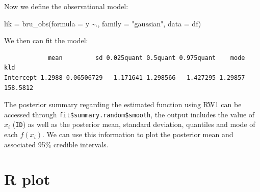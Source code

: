 \documentclass[
  letterpaper,
  DIV=11,
  numbers=noendperiod]{scrartcl}
\newenvironment{Shaded}{\begin{snugshade}}{\end{snugshade}}
\newcommand{\AttributeTok}[1]{\textcolor[rgb]{0.40,0.45,0.13}{#1}}
\newcommand{\FunctionTok}[1]{\textcolor[rgb]{0.28,0.35,0.67}{#1}}
\newcommand{\NormalTok}[1]{\textcolor[rgb]{0.00,0.23,0.31}{#1}}
\newcommand{\OtherTok}[1]{\textcolor[rgb]{0.00,0.23,0.31}{#1}}
\newcommand{\SpecialCharTok}[1]{\textcolor[rgb]{0.37,0.37,0.37}{#1}}
\newcommand{\StringTok}[1]{\textcolor[rgb]{0.13,0.47,0.30}{#1}}
\begin{document}
Now we define the observational model:

\begin{Shaded}
\begin{Highlighting}[]
\NormalTok{lik }\OtherTok{=}  \FunctionTok{bru\_obs}\NormalTok{(}\AttributeTok{formula =}\NormalTok{ y }\SpecialCharTok{\textasciitilde{}}\NormalTok{.,}
            \AttributeTok{family =} \StringTok{"gaussian"}\NormalTok{,}
            \AttributeTok{data =}\NormalTok{ df)}
\end{Highlighting}
\end{Shaded}

We then can fit the model:

\begin{Shaded}
\end{Shaded}

\begin{verbatim}
            mean         sd 0.025quant 0.5quant 0.975quant    mode      kld
Intercept 1.2988 0.06506729   1.171641 1.298566   1.427295 1.29857 158.5812
\end{verbatim}

The posterior summary regarding the estimated function using RW1 can be
accessed through \texttt{fit\$summary.random\$smooth}, the output
includes the value of \(x_i\) (\texttt{ID}) as well as the posterior
mean, standard deviation, quantiles and mode of each \(f(x_i)\). We can
use this information to plot the posterior mean and associated 95\%
credible intervals.

\section{R plot}
\end{document}

